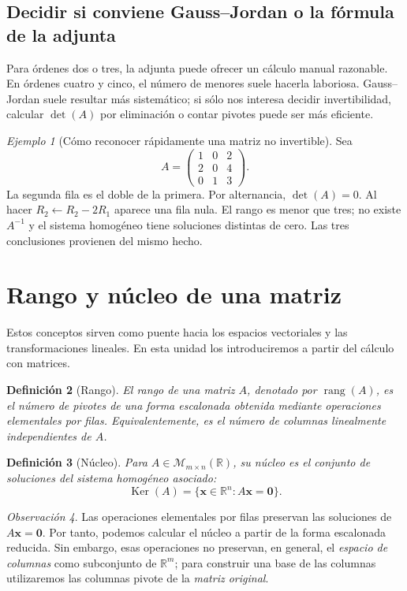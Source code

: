 \documentclass[12pt]{article}
\newtheorem{definicion}{Definición}[section]
\theoremstyle{remark}
\newtheorem{observacion}[definicion]{Observación}
\newtheorem{ejemplo}[definicion]{Ejemplo}
\newcommand{\R}{\mathbb{R}}
\newcommand{\Mat}[2]{\mathcal{M}_{#1\times #2}}
\newcommand{\rang}{\operatorname{rang}}
\newcommand{\Ker}{\operatorname{Ker}}
\newcommand{\vect}[1]{\boldsymbol{#1}}
\begin{document}
\subsection{Decidir si conviene Gauss--Jordan o la fórmula de la adjunta}
Para órdenes dos o tres, la adjunta puede ofrecer un cálculo manual razonable. En órdenes cuatro y cinco, el número de menores suele hacerla laboriosa. Gauss--Jordan suele resultar más sistemático; si sólo nos interesa decidir invertibilidad, calcular $\det(A)$ por eliminación o contar pivotes puede ser más eficiente.
\begin{ejemplo}[Cómo reconocer rápidamente una matriz no invertible]
Sea
\[
A=\begin{pmatrix}1&0&2\\2&0&4\\0&1&3\end{pmatrix}.
\]
La segunda fila es el doble de la primera. Por alternancia, $\det(A)=0$. Al hacer $R_2\leftarrow R_2-2R_1$ aparece una fila nula. El rango es menor que tres; no existe $A^{-1}$ y el sistema homogéneo tiene soluciones distintas de cero. Las tres conclusiones provienen del mismo hecho.
\end{ejemplo}


\section{Rango y núcleo de una matriz}
Estos conceptos sirven como puente hacia los espacios vectoriales y las transformaciones lineales. En esta unidad los introduciremos a partir del cálculo con matrices.

\begin{definicion}[Rango]
El \emph{rango} de una matriz $A$, denotado por $\rang(A)$, es el número de pivotes de una forma escalonada obtenida mediante operaciones elementales por filas. Equivalentemente, es el número de columnas linealmente independientes de $A$.
\end{definicion}

\begin{definicion}[Núcleo]
Para $A\in\Mat{m}{n}(\R)$, su \emph{núcleo} es el conjunto de soluciones del sistema homogéneo asociado:
\[
\boxed{\Ker(A)=\{\vect{x}\in\R^n:A\vect{x}=\vect{0}\}.}
\]
\end{definicion}

\begin{observacion}
Las operaciones elementales por filas preservan las soluciones de $A\vect{x}=\vect0$. Por tanto, podemos calcular el núcleo a partir de la forma escalonada reducida. Sin embargo, esas operaciones no preservan, en general, el \emph{espacio de columnas} como subconjunto de $\R^m$; para construir una base de las columnas utilizaremos las columnas pivote de la \emph{matriz original}.
\end{observacion}
\end{document}
